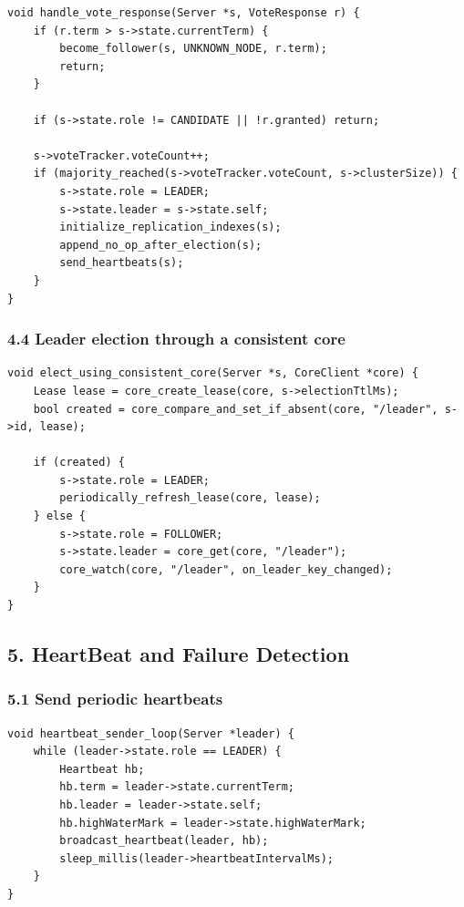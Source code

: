 \documentclass[10pt,letterpaper]{article}
\begin{document}
\begin{verbatim}
void handle_vote_response(Server *s, VoteResponse r) {
    if (r.term > s->state.currentTerm) {
        become_follower(s, UNKNOWN_NODE, r.term);
        return;
    }

    if (s->state.role != CANDIDATE || !r.granted) return;

    s->voteTracker.voteCount++;
    if (majority_reached(s->voteTracker.voteCount, s->clusterSize)) {
        s->state.role = LEADER;
        s->state.leader = s->state.self;
        initialize_replication_indexes(s);
        append_no_op_after_election(s);
        send_heartbeats(s);
    }
}
\end{verbatim}

\subsubsection*{4.4 Leader election through a consistent core}

\begin{verbatim}
void elect_using_consistent_core(Server *s, CoreClient *core) {
    Lease lease = core_create_lease(core, s->electionTtlMs);
    bool created = core_compare_and_set_if_absent(core, "/leader", s->id, lease);

    if (created) {
        s->state.role = LEADER;
        periodically_refresh_lease(core, lease);
    } else {
        s->state.role = FOLLOWER;
        s->state.leader = core_get(core, "/leader");
        core_watch(core, "/leader", on_leader_key_changed);
    }
}
\end{verbatim}

\subsection*{5. HeartBeat and Failure Detection}

\subsubsection*{5.1 Send periodic heartbeats}

\begin{verbatim}
void heartbeat_sender_loop(Server *leader) {
    while (leader->state.role == LEADER) {
        Heartbeat hb;
        hb.term = leader->state.currentTerm;
        hb.leader = leader->state.self;
        hb.highWaterMark = leader->state.highWaterMark;
        broadcast_heartbeat(leader, hb);
        sleep_millis(leader->heartbeatIntervalMs);
    }
}
\end{verbatim}
\end{document}
